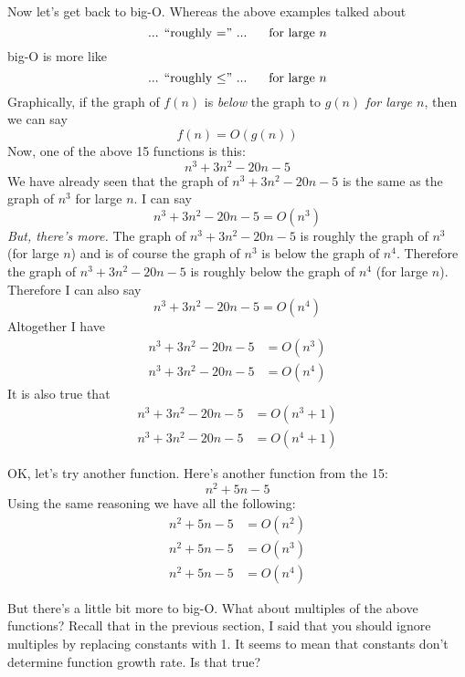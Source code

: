 Now let's get back to big-O.
Whereas the above examples talked about 
\[
\text{... \lq\lq roughly $=$'' ... \,\,\,\,\, for large $n$}
\]
big-O is more like
\[
\text{... \lq\lq roughly $\leq$'' ... \,\,\,\,\, for large $n$}
\]
Graphically, if the graph of $f(n)$ is \textit{below} the graph to $g(n)$
\textit{for large $n$}, then we can say
\[
f(n) = O(g(n))
\]
Now, one of the above 15 functions is this:
\[
n^3 + 3n^2 - 20n - 5
\]
We have already seen that the graph of 
$n^3 + 3n^2 - 20n - 5$
is the same as the graph of $n^3$ for large $n$. 
I can say
\[
n^3 + 3n^2 - 20n - 5 = O(n^3)
\]
\textit{But, there's more.}
The graph of $n^3 + 3n^2 - 20n - 5$ is roughly the graph of $n^3$
(for large $n$) and 
is of course the graph of $n^3$ is below the graph of $n^4$.
Therefore the graph of 
$n^3 + 3n^2 - 20n - 5$
is roughly below the graph of $n^4$ (for large $n$).
Therefore I can also say
\[
n^3 + 3n^2 - 20n - 5 = O(n^4)
\]
Altogether I have
\begin{align*}
n^3 + 3n^2 - 20n - 5 &= O(n^3) \\
n^3 + 3n^2 - 20n - 5 &= O(n^4)
\end{align*}
It is also true that
\begin{align*}
n^3 + 3n^2 - 20n - 5 &= O(n^3 + 1) \\
n^3 + 3n^2 - 20n - 5 &= O(n^4 + 1)
\end{align*}

OK, let's try another function.
Here's another function from the 15:
\[
n^2 + 5n - 5
\]
Using the same reasoning we have all the following:
\begin{align*}
n^2 + 5n - 5 &= O(n^2) \\
n^2 + 5n - 5 &= O(n^3) \\
n^2 + 5n - 5 &= O(n^4)
\end{align*}


But there's a little bit more to big-O.
What about multiples of the above functions?
Recall that in the previous section,
I said that you should ignore multiples by replacing constants with 1.
It seems to mean that constants don't determine function growth rate.
Is that true?

